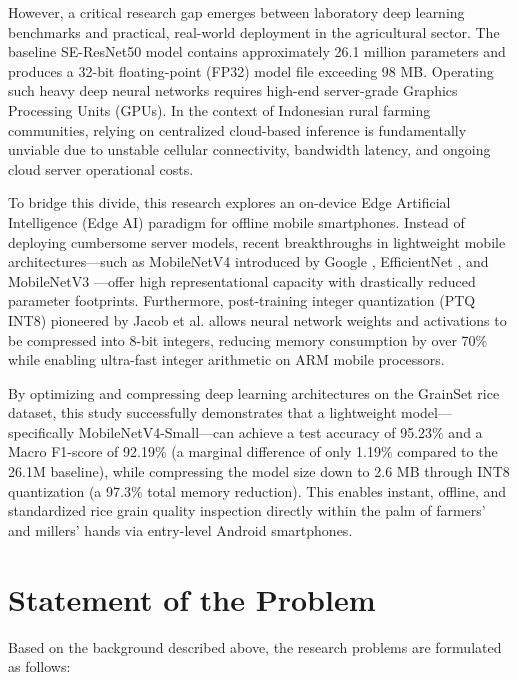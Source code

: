 	However, a critical research gap emerges between laboratory deep learning benchmarks and practical, real-world deployment in the agricultural sector. The baseline SE-ResNet50 model contains approximately 26.1 million parameters and produces a 32-bit floating-point (FP32) model file exceeding 98 MB. Operating such heavy deep neural networks requires high-end server-grade Graphics Processing Units (GPUs). In the context of Indonesian rural farming communities, relying on centralized cloud-based inference is fundamentally unviable due to unstable cellular connectivity, bandwidth latency, and ongoing cloud server operational costs.
	
	To bridge this divide, this research explores an on-device Edge Artificial Intelligence (Edge AI) paradigm for offline mobile smartphones. Instead of deploying cumbersome server models, recent breakthroughs in lightweight mobile architectures—such as MobileNetV4 introduced by Google \cite{qin2024mobilenetv4}, EfficientNet \cite{tan2019efficientnet}, and MobileNetV3 \cite{howard2019mobilenetv3}—offer high representational capacity with drastically reduced parameter footprints. Furthermore, post-training integer quantization (PTQ INT8) pioneered by Jacob et al. \cite{jacob2018quantization} allows neural network weights and activations to be compressed into 8-bit integers, reducing memory consumption by over 70\% while enabling ultra-fast integer arithmetic on ARM mobile processors.
	
	By optimizing and compressing deep learning architectures on the GrainSet rice dataset, this study successfully demonstrates that a lightweight model—specifically MobileNetV4-Small—can achieve a test accuracy of 95.23\% and a Macro F1-score of 92.19\% (a marginal difference of only 1.19\% compared to the 26.1M baseline), while compressing the model size down to 2.6 MB through INT8 quantization (a 97.3\% total memory reduction). This enables instant, offline, and standardized rice grain quality inspection directly within the palm of farmers' and millers' hands via entry-level Android smartphones.
	
	\section{Statement of the Problem}
	Based on the background described above, the research problems are formulated as follows:
	
